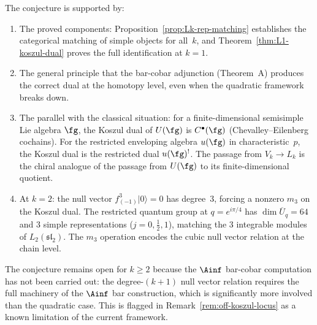 \begin{remark}
\label{rem:Lk-koszul-evidence}
The conjecture is supported by:
\begin{enumerate}[label=\textup{(\arabic*)},nosep]
\item The proved components:
 Proposition~\ref{prop:Lk-rep-matching} establishes the
 categorical matching of simple objects for all~$k$, and
 Theorem~\ref{thm:L1-koszul-dual} proves the full
 identification at $k = 1$.
\item The general principle that the bar-cobar adjunction
 (Theorem~A) produces the correct dual at the homotopy level,
 even when the quadratic framework breaks down.
\item The parallel with the classical situation: for a
 finite-dimensional semisimple Lie algebra $\fg$, the
 Koszul dual of $U(\fg)$ is $C^\bullet(\fg)$
 (Chevalley--Eilenberg cochains). For the restricted
 enveloping algebra $u(\fg)$ in characteristic~$p$, the
 Koszul dual is the restricted dual $u(\fg)^!$. The
 passage from $V_k \to L_k$ is the chiral analogue of the
 passage from $U(\fg)$ to its finite-dimensional quotient.
\item At $k = 2$: the null vector $f_{(-1)}^3|0\rangle = 0$
 has degree~$3$, forcing a nonzero $m_3$ on the Koszul dual.
 The restricted quantum group at $q = e^{i\pi/4}$ has
 $\dim \overline{U}_q = 64$ and $3$ simple representations
 ($j = 0, \tfrac{1}{2}, 1$), matching the $3$ integrable
 modules of $L_2(\mathfrak{sl}_2)$. The $m_3$ operation
 encodes the cubic null vector relation at the chain level.
\end{enumerate}
The conjecture remains open for $k \ge 2$ because the
$\Ainf$ bar-cobar computation has not been carried out: the
degree-$(k+1)$ null vector relation requires the full
machinery of the $\Ainf$ bar construction, which is
significantly more involved than the quadratic case. This is
flagged in
Remark~\textup{\ref{rem:off-koszul-locus}} as a known
limitation of the current framework.
\end{remark}

